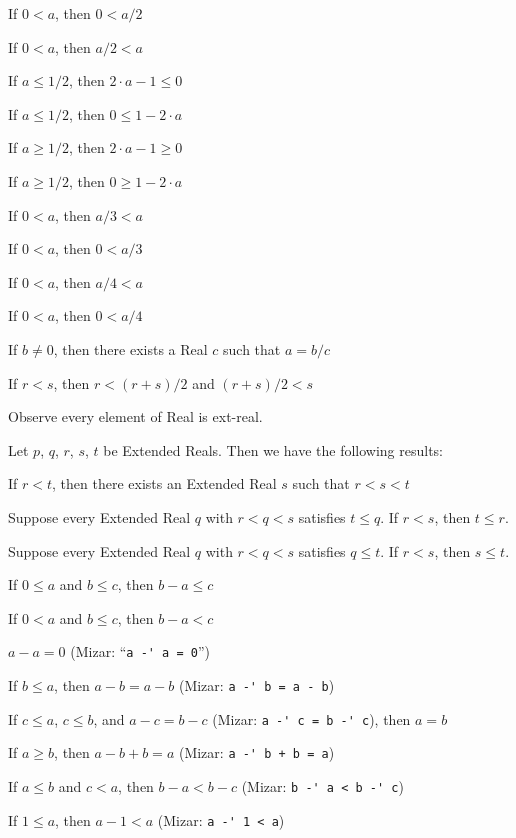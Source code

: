 \documentclass{article}
\let\xrbreak\medbreak
\begin{document}
\begin{thm}
  \xrbreak
\item\label{xreal1:215} If $0<a$, then $0<a/2$
\item\label{xreal1:216} If $0<a$, then $a/2<a$
\item\label{xreal1:217} If $a\leq1/2$, then $2\cdot a-1\leq0$
\item\label{xreal1:218} If $a\leq1/2$, then $0\leq1-2\cdot a$
\item\label{xreal1:219} If $a\geq1/2$, then $2\cdot a-1\geq0$
\item\label{xreal1:220} If $a\geq1/2$, then $0\geq1-2\cdot a$
  \xrbreak
\item\label{xreal1:221} If $0<a$, then $a/3<a$
\item\label{xreal1:222} If $0<a$, then $0<a/3$
  \xrbreak
\item\label{xreal1:223} If $0<a$, then $a/4<a$
\item\label{xreal1:224} If $0<a$, then $0<a/4$
\item\label{xreal1:225} If $b\neq0$, then there exists a Real $c$ such
  that $a=b/c$
  \xrbreak
\item\label{xreal1:226} If $r<s$, then $r<(r+s)/2$ and $(r+s)/2<s$
\end{thm}

Observe every element of Real is ext-real.

Let $p$, $q$, $r$, $s$, $t$ be Extended Reals. Then we have the
following results:
\begin{thm}
\item\label{xreal1:227} If $r<t$, then there exists an Extended Real $s$
  such that $r<s<t$
\item\label{xreal1:228} Suppose every Extended Real $q$ with $r<q<s$
  satisfies $t\leq q$. If $r<s$, then $t\leq r$.
\item\label{xreal1:229} Suppose every Extended Real $q$ with $r<q<s$
  satisfies $q\leq t$. If $r<s$, then $s\leq t$.
\item\label{xreal1:230} If $0\leq a$ and $b\leq c$, then $b-a\leq c$
\item\label{xreal1:231} If $0<a$ and $b\leq c$, then $b-a<c$
  \xrbreak
\item\label{xreal1:232} $a-a=0$ (Mizar: ``\verb#a -' a = 0#'')
\item\label{xreal1:233} If $b\leq a$, then $a-b=a-b$ (Mizar:
  \verb#a -' b = a - b#)
\item\label{xreal1:234} If $c\leq a$, $c\leq b$, and $a-c=b-c$
  (Mizar: \verb#a -' c = b -' c#), then $a=b$
\item\label{xreal1:235} If $a\geq b$, then $a-b+b=a$ (Mizar:
  \verb#a -' b + b = a#)
\item\label{xreal1:236} If $a\leq b$ and $c<a$, then $b-a<b-c$ (Mizar:
  \verb#b -' a < b -' c#)
\item\label{xreal1:237} If $1\leq a$, then $a-1<a$ (Mizar:
  \verb#a -' 1 < a#)
\end{thm}
\end{document}
